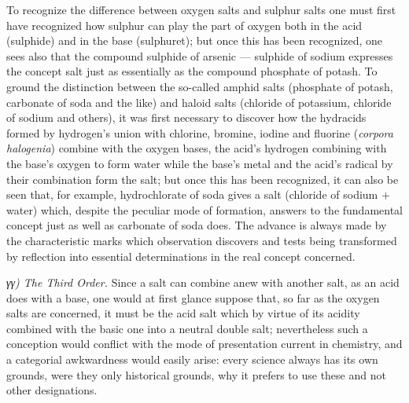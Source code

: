 \documentclass[12pt,a4paper]{book}
\begin{document}
To recognize the difference between oxygen salts and sulphur salts one must
first have recognized how sulphur can play the part of oxygen both in the acid
(sulphide) and in the base (sulphuret); but once this has been recognized, one
sees also that the compound sulphide of arsenic --- sulphide of sodium
expresses the concept salt just as essentially as the compound phosphate of
potash. To ground the distinction between the so-called amphid salts
(phosphate of potash, carbonate of soda and the like) and haloid salts
(chloride of potassium, chloride of sodium and others), it was first necessary
to discover how the hydracids formed by hydrogen's union with chlorine,
bromine, iodine and fluorine (\textit{corpora halogenia}) combine with the
oxygen bases, the acid's hydrogen combining with the base's oxygen to form
water while the base's metal and the acid's radical by their combination form
the salt; but once this has been recognized, it can also be seen that, for
example, hydrochlorate of soda gives a salt (chloride of sodium $+$ water)
which, despite the peculiar mode of formation, answers to the fundamental
concept just as well as carbonate of soda does. The advance is always made by
the characteristic marks which observation discovers
\setcounter{footnote}{0}
and tests being transformed by reflection into essential determinations in the
real concept concerned.

\emph{γγ) The Third Order.} Since a salt can combine anew with another salt, as
an acid does with a base, one would at first glance suppose that, so far as the
oxygen salts are concerned, it must be the acid salt which by virtue of its
acidity combined with the basic one into a neutral double salt; nevertheless
such a conception would conflict with the mode of presentation current in
chemistry, and a categorial awkwardness would easily arise: every science
always has its own grounds, were they only historical grounds, why it prefers
to use these and not other designations.
\end{document}
